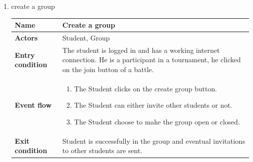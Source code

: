 \documentclass{article}
\begin{document}
\begin{enumerate}[label=\textbf{UC\arabic*}:]
        
        \item create a group
            \begin{center}
            \begin{tabular}{ | m{8em} | m{10cm}|  } 
            \hline 
            \textbf{Name} & Create a group\\[1ex] 
            \hline 
            \textbf{Actors} & Student, Group\\[1ex] 
            \hline 
            \textbf{Entry condition} & The student is logged in and has a working internet connection. He is a participant in a tournament, he clicked on the join button of a battle. \\[1ex] 
            \hline 
            \textbf{Event flow} & \begin{enumerate}[label=\textbf{\arabic*}:]
                \item The Student clicks on the create group button.
                \item The Student can either invite other students or not.
                \item The Student choose to make the group open or closed.
            \end{enumerate} \\[1ex]
            \hline 
            \textbf{Exit condition} & Student is successfully in the group and eventual invitations to other students are sent.\\[1ex]
            \hline
            \end{tabular}
            \end{center}




\end{enumerate}
\end{document}
